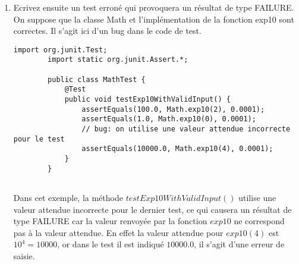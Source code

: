 \begin{enumerate}
\begin{lstlisting}[style=monstyle]
		public class MathTest {
			@Test
			public void testExp10WithValidInput() {
				// bug: on utilise la m\'ethode assertEquals() qui teste si les valeurs sont \'egales,
				// alors qu'on devrait utiliser la m\'ethode assertEquals() qui teste si les deux valeurs sont \'egales avec un certain delta.
				assertEquals(100.0, Math.exp10(2));
				assertEquals(1.0, Math.exp10(0));
				assertEquals(1000.0, Math.exp10(3));
			}
		}
		
	\end{lstlisting}
Dans cet exemple, la méthode testExp10WithValidInput() utilise la méthode assertEquals() qui teste si les deux valeurs sont égales. Cependant, la fonction exp10 peut renvoyer un résultat avec une certaine précision, il est donc nécessaire de vérifier si les deux valeurs sont égales avec un certain delta.
Ainsi, le test échouera car il n'y a pas de tolérance pour l'erreur de calcul. Ce qui causera un résultat de type ERROR.
	\item Ecrivez ensuite un test erroné qui provoquera un résultat de type FAILURE. On suppose que la classe Math et l'implémentation de la fonction exp10 sont correctes. Il s'agit ici d'un bug dans le code de test.
	\begin{lstlisting}[style=monstyle]
		import org.junit.Test;
		import static org.junit.Assert.*;
		
		public class MathTest {
			@Test
			public void testExp10WithValidInput() {
				assertEquals(100.0, Math.exp10(2), 0.0001);
				assertEquals(1.0, Math.exp10(0), 0.0001);
				// bug: on utilise une valeur attendue incorrecte pour le test
				assertEquals(10000.0, Math.exp10(4), 0.0001);
			}
		}
		
	\end{lstlisting}
Dans cet exemple, la méthode $testExp10WithValidInput()$ utilise une valeur attendue incorrecte pour le dernier test, ce qui causera un résultat de type FAILURE car la valeur renvoyée par la fonction $exp10$ ne correspond pas à la valeur attendue.
En effet la valeur attendue pour $exp10(4)$ est $10^4 = 10 000$, or dans le test il est indiqué $10000.0$, il s'agit d'une erreur de saisie.
\end{enumerate}

\newpage

